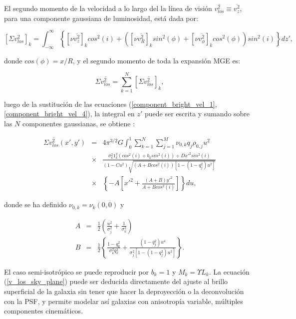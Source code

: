 El segundo momento de la velocidad a lo largo del la línea de visión $\overline{v_{los}^2} \equiv \overline{v_z^2}$, para una componente gaussiana de luminosidad, está dada por:

\begin{equation}
\left[ \Sigma v_{los}^2 \right]_k = \int_{-\infty}^{\infty} \left \{ \left[  \nu \overline{v_{z}^2} \right]_k  cos^2 (i) + \left( \left[ \nu \overline{v_{R}^2} \right]_k sin^2 (\phi) + \left[ \nu \overline{v_{\phi}^2} \right]_k cos^2 (\phi) \right ) sin^2 (i) \right \} dz',
\end{equation}

donde $cos(\phi) = x/R$, y el segundo momento de toda la expansión MGE es:

\begin{equation}
 \Sigma \overline{v_{los}^2} = \sum_{k = 1}^N \left[ \Sigma \overline{v_{los}^2} \right]_k ,
\end{equation}

luego de la sustitución de las ecuaciones (\ref{component_bright_vel_1}, \ref{component_bright_vel_4}), la integral en $z'$ puede ser escrita y sumando sobre las $N$ componentes gaussianas, se obtiene \cite{2008MNRAS.390_71C}:


\begin{eqnarray}
\label{v_los_sky_plane}
\Sigma \overline{v_{los}^2}(x', y') &=& 4\pi^{3/2} G \int_0^1 \sum_{k=1}^N \sum_{j=1}^M \nu_{0,k} q_j \rho_{0,j} u^2 \\
    &\times & \frac{ \sigma_k^2 1_k^2(cos^2(i) + b_k sin^2(i)) + Dx'^2 sin^2(i) }{ (1-Cu^2) \sqrt{ (A+B cos^2 (i) ) [ 1-(1-q_j^2)u^2 ] } } \\
  & \times & \left \{  -A\left[ x'^2 + \frac{(A+B)y'^2}{ A+Bcos^2(i) } \right]  \right \} du,
\end{eqnarray}

donde se ha definido $\nu_{0,k}=\nu_k(0,0)$ y

\begin{eqnarray}
A &=& \frac{1}{2} \left( \frac{u^2}{\sigma_j^2} + \frac{1}{\sigma_k^2}  \right) \\
B &=& \frac{1}{2} \left\{ \frac{1-q_k^2}{\sigma_k^2 q_k^2} + \frac{(1-q_j^2)u^4 }{\sigma_j^2 \left[ 1-(1-q_j^2)u^2 \right] }  \right\}.
\end{eqnarray}

El caso semi-isotrópico se puede reproducir por $b_k = 1$ y $M_k = \Upsilon L_k$. La ecuación (\ref{v_los_sky_plane}) puede ser deducida directamente del ajuste al brillo superficial de la galaxia sin tener que hacer la deproyección o la deconvolución con la PSF, y permite modelar así galaxias con anisotropía variable, múltiples componentes cinemáticos.\\


